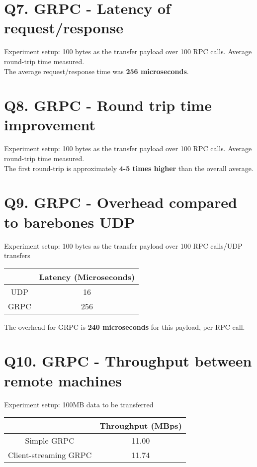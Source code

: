 \documentclass[a4paper]{article}
\begin{document}
\section*{Q7. GRPC - Latency of request/response}
Experiment setup: 100 bytes as the transfer payload over 100 RPC calls. Average round-trip time measured.\\
The average request/response time was \textbf{256 microseconds}.

\section*{Q8. GRPC - Round trip time improvement}
Experiment setup: 100 bytes as the transfer payload over 100 RPC calls. Average round-trip time measured.\\
The first round-trip is approximately \textbf{4-5 times higher} than the overall average.

\section*{Q9. GRPC - Overhead compared to barebones UDP}
Experiment setup: 100 bytes as the transfer payload over 100 RPC calls/UDP transfers
\begin{center}
	\begin{tabular}{ |c|c| } 
		\hline
		& Latency (Microseconds) \\ 
		\hline
		\hline
		UDP & 16 \\ 
		\hline
		GRPC & 256 \\ 
		\hline
	\end{tabular}
\end{center}
The overhead for GRPC is \textbf{240 microseconds} for this payload, per RPC call.

\section*{Q10. GRPC - Throughput between remote machines}
Experiment setup: 100MB data to be transferred
\begin{center}
	\begin{tabular}{ |c|c| } 
		\hline
		& Throughput (MBps) \\ 
		\hline
		\hline
		Simple GRPC & 11.00 \\ 
		\hline
		Client-streaming GRPC & 11.74 \\ 
		\hline
	\end{tabular}
\end{center}
\end{document}
